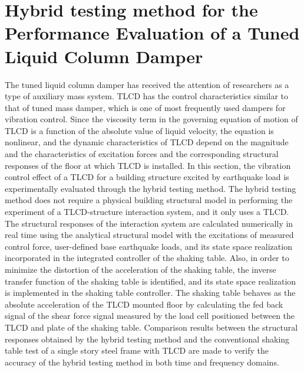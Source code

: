 \section{Hybrid testing method for the Performance Evaluation of a Tuned Liquid Column Damper}
\label{chap:4}

The tuned liquid column damper has received the attention of researchers as a type of auxiliary mass system\citep{samali1998wind}. TLCD has the control characteristics similar to that of tuned mass damper, which is one of most frequently used dampers for vibration control. Since the viscosity term in the governing equation of motion of TLCD is a function of the absolute value of liquid velocity, the equation is nonlinear, and the dynamic characteristics of TLCD depend on the magnitude and the characteristics of excitation forces and the corresponding structural responses of the floor at which TLCD is installed\citep{yalla2001liquid}.
In this section, the vibration control effect of a TLCD for a building structure excited by earthquake load is experimentally evaluated through the hybrid testing method. The hybrid testing method does not require a physical building structural model in performing the experiment of a TLCD-structure interaction system, and it only uses a TLCD. The structural responses of the interaction system are calculated numerically in real time using the analytical structural model with the excitations of measured control force, user-defined base earthquake loads, and its state space realization incorporated in the integrated controller of the shaking table. Also, in order to minimize the distortion of the acceleration of the shaking table, the inverse transfer function of the shaking table is identified, and its state space realization is implemented in the shaking table controller. The shaking table behaves as the absolute acceleration of the TLCD mounted floor by calculating the fed back signal of the shear force signal measured by the load cell positioned between the TLCD and plate of the shaking table. Comparison results between the structural responses obtained by the hybrid testing method and the conventional shaking table test of a single story steel frame with TLCD are made to verify the accuracy of the hybrid testing method in both time and frequency domains.

